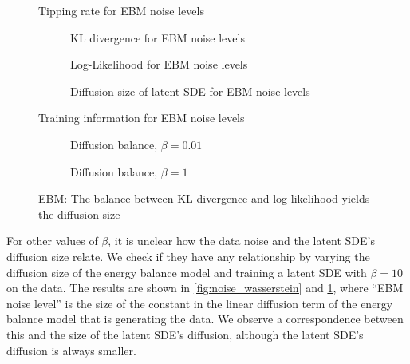 \documentclass[twoside,11pt]{article}
\begin{document}
\begin{figure}
    \begin{center}
    
    \end{center}
    \caption{Tipping rate for EBM noise levels}
    \label{fig:noise_tipping_rate}
\end{figure}

\begin{figure}
    \begin{subfigure}{.5\textwidth}
        \centering
        
        \caption{KL divergence for EBM noise levels}
    \end{subfigure}
    \begin{subfigure}{.5\textwidth}
        \centering
        
        \caption{Log-Likelihood for EBM noise levels}
    \end{subfigure}
    \begin{subfigure}{\textwidth}
        \centering
        
        \caption{Diffusion size of latent SDE for EBM noise levels}
    \end{subfigure}
    \caption{Training information for EBM noise levels}
    \label{fig:noise_kl_logpxs}
\end{figure}

\begin{figure}
    \begin{subfigure}{.5\textwidth}
        \centering
        
        \caption{Diffusion balance, \(\beta=0.01\)}
    \end{subfigure}
    \begin{subfigure}{0.5\textwidth}
        \centering
        
        \caption{Diffusion balance, \(\beta=1\)}
    \end{subfigure}
    \caption{EBM: The balance between KL divergence and log-likelihood yields the diffusion size}
    \label{fig:balance}
\end{figure}

For other values of \(\beta\), it is unclear how the data noise and the latent SDE's diffusion size relate. We check if they have any relationship by varying the diffusion size of the energy balance model and training a latent SDE with \(\beta=10\) on the data. The results are shown in \cref{fig:noise_wasserstein} and \cref{fig:noise_tipping_rate}, where \enquote{EBM noise level} is the size of the constant in the linear diffusion term of the energy balance model that is generating the data. We observe a correspondence between this and the size of the latent SDE's diffusion, although the latent SDE's diffusion is always smaller.
\end{document}
